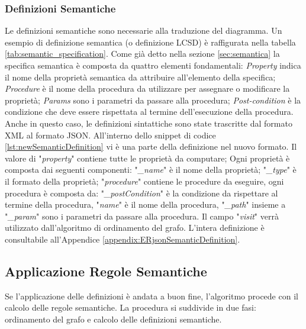             \subsubsection{Definizioni Semantiche}
                Le definizioni semantiche sono necessarie alla traduzione del diagramma. Un esempio di definizione semantica (o definizione LCSD) è raffigurata nella tabella \ref{tab:semantic_specification}. Come già detto nella sezione \ref{sec:semantica} la specifica semantica è composta da quattro elementi fondamentali: \textit{Property} indica il nome della proprietà semantica da attribuire all'elemento della specifica; \textit{Procedure} è il nome della procedura da utilizzare per assegnare o modificare la proprietà; \textit{Params} sono i parametri da passare alla procedura; \textit{Post-condition} è la condizione che deve essere rispettata al termine dell'esecuzione della procedura.
                \newline
                Anche in questo caso, le definizioni sintattiche sono state trascritte dal formato XML al formato JSON. All'interno dello snippet di codice \ref{lst:newSemanticDefinition} vi è una parte della definizione nel nuovo formato. 
                \newline
                Il valore di "\textit{property}" contiene tutte le proprietà da computare; Ogni proprietà è composta dai seguenti componenti: "\textit{\_name}" è il nome della proprietà; "\textit{\_type}" è il formato della proprietà; "\textit{procedure}" contiene le procedure da eseguire, ogni procedura è composta da: "\textit{\_postCondition}" è la condizione da rispettare al termine della procedura, "\textit{name}" è il nome della procedura, "\textit{\_path}" insieme a "\textit{\_param}" sono i parametri da passare alla procedura. Il campo "\textit{visit}" verrà utilizzato dall'algoritmo di ordinamento del grafo.
                \newline
                L'intera definizione è consultabile all'Appendice \ref{appendix:ERjsonSemanticDefinition}.
                \begin{spacing}{0.5}
                    
                \end{spacing}

        \subsection{Applicazione Regole Semantiche}
            Se l'applicazione delle definizioni è andata a buon fine, l'algoritmo procede con il calcolo delle regole semantiche. La procedura si suddivide in due fasi: ordinamento del grafo e calcolo delle definizioni semantiche.

